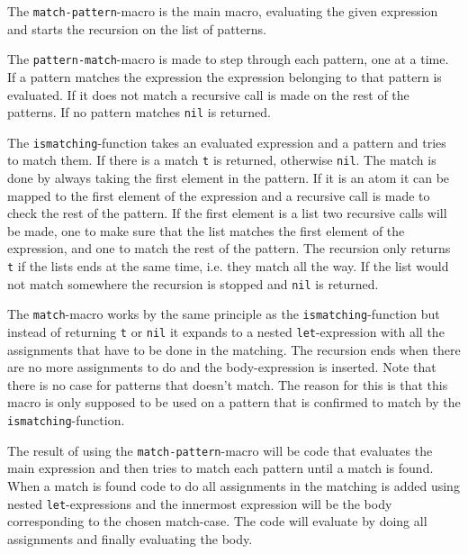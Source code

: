 \documentclass[a4paper,11pt]{article}
\begin{document}
The \texttt{match-pattern}-macro is the main macro, evaluating the given expression and starts the recursion on the list of patterns.

The \texttt{pattern-match}-macro is made to step through each pattern, one at a time. If a pattern matches the expression the expression belonging to that pattern is evaluated. If it does not match a recursive call is made on the rest of the patterns. If no pattern matches \texttt{nil} is returned.

The \texttt{ismatching}-function takes an evaluated expression and a pattern and tries to match them. If there is a match \texttt{t} is returned, otherwise \texttt{nil}. The match is done by always taking the first element in the pattern. If it is an atom it can be mapped to the first element of the expression and a recursive call is made to check the rest of the pattern. If the first element is a list two recursive calls will be made, one to make sure that the list matches the first element of the expression, and one to match the rest of the pattern. The recursion only returns \texttt{t} if the lists ends at the same time, i.e. they match all the way. If the list would not match somewhere the recursion is stopped and \texttt{nil} is returned.

The \texttt{match}-macro works by the same principle as the \texttt{ismatching}-function but instead of returning \texttt{t} or \texttt{nil} it expands to a nested \texttt{let}-expression with all the assignments that have to be done in the matching. The recursion ends when there are no more assignments to do and the body-expression is inserted. Note that there is no case for patterns that doesn't match. The reason for this is that this macro is only supposed to be used on a pattern that is confirmed to match by the \texttt{ismatching}-function.

The result of using the \texttt{match-pattern}-macro will be code that evaluates the main expression and then tries to match each pattern until a match is found. When a match is found code to do all assignments in the matching is added using nested \texttt{let}-expressions and the innermost expression will be the body corresponding to the chosen match-case. The code will evaluate by doing all assignments and finally evaluating the body.
\end{document}
